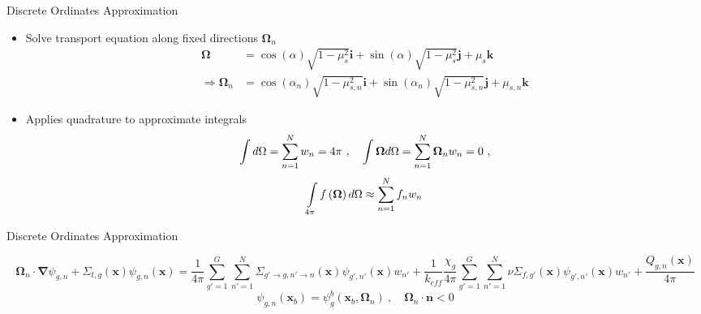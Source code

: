 \begin{frame}[t]{Discrete Ordinates Approximation}
  
  \begin{itemize}
    \item Solve transport equation along fixed directions $\bm \Omega_n$
    \begin{align*}
    \bm\Omega &= \cos\left(\alpha\right)\sqrt{1-\mu_s^2}\bm i + 
    \sin\left(\alpha\right)\sqrt{1-\mu_s^2}\bm j + \mu_s\bm k \\
    \Rightarrow \bm\Omega_n &= \cos\left(\alpha_n\right)\sqrt{1-\mu_{s,n}^2}\bm 
    i + \sin\left(\alpha_n\right)\sqrt{1-\mu_{s,n}^2}\bm j + \mu_{s,n}\bm k
    \end{align*}
    \item Applies quadrature to approximate integrals
    \begin{equation*}
    \intop d\Omega = \sum_{n=1}^N w_n = 4\pi\ ,\quad \intop \bm\Omega d\Omega = 
    \sum_{n=1}^N \bm\Omega_n w_n = 0\ ,
    \end{equation*}
    \begin{equation*}
    \intop_{4\pi} f\left(\bm\Omega\right)d\Omega \approx \sum_{n=1}^N f_n w_n
    \end{equation*}
  \end{itemize}
  
\end{frame}
  
  
\begin{frame}[t]{Discrete Ordinates Approximation}
    
        \begin{dmath*}
            \bm\Omega_n\cdot\bm\nabla\psi_{g,n} + \Sigma_{t,g}\left(\bm x\right)\psi_{g,n}\left(\bm x\right) = {\frac{1}{4\pi}\sum_{g'=1}^G \sum_{n'=1}^N \Sigma_{g'\rightarrow g,n'\rightarrow n}\left(\bm x\right)\psi_{g',n'}\left(\bm x\right) w_{n'}} + {\frac{1}{k_{eff}}\frac{\chi_g}{4\pi} \sum_{g'=1}^G \sum_{n'=1}^N \nu\Sigma_{f,g'}\left(\bm x\right)\psi_{g',n'}\left(\bm x\right) w_{n'}} + \frac{Q_{g,n}\left(\bm x\right)}{4\pi}
        \end{dmath*}
        \begin{equation*}
        \psi_{g,n}\left(\bm x_b\right) = \psi_{g}^b\left(\bm x_b,\bm{\Omega}_n\right)\ ,\quad \bm{\Omega}_n\cdot \bm n < 0
        \end{equation*}
    
\end{frame}


